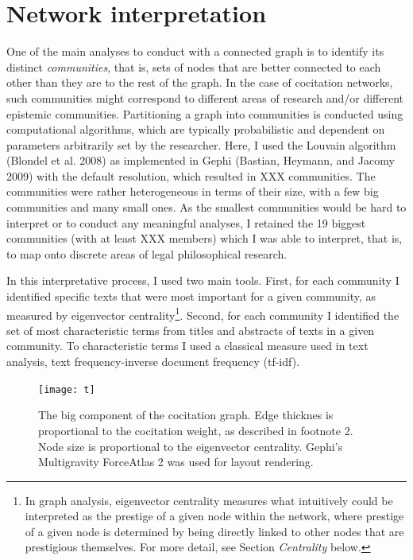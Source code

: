 \documentclass[
]{article}
\begin{document}
\hypertarget{network-interpretation}{%
\section{Network interpretation}\label{network-interpretation}}

One of the main analyses to conduct with a connected graph is to identify its distinct \emph{communities}, that is, sets of nodes that are better connected to each other than they are to the rest of the graph. In the case of cocitation networks, such communities might correspond to different areas of research and/or different epistemic communities. Partitioning a graph into communities is conducted using computational algorithms, which are typically probabilistic and dependent on parameters arbitrarily set by the researcher. Here, I used the Louvain algorithm (Blondel et al. 2008) as implemented in Gephi (Bastian, Heymann, and Jacomy 2009) with the default resolution, which resulted in XXX communities. The communities were rather heterogeneous in terms of their size, with a few big communities and many small ones. As the smallest communities would be hard to interpret or to conduct any meaningful analyses, I retained the 19 biggest communities (with at least XXX members) which I was able to interpret, that is, to map onto discrete areas of legal philosophical research.

In this interpretative process, I used two main tools. First, for each community I identified specific texts that were most important for a given community, as measured by eigenvector centrality\footnote{In graph analysis, eigenvector centrality measures what intuitively could be interpreted as the prestige of a given node within the network, where prestige of a given node is determined by being directly linked to other nodes that are prestigious themselves. For more detail, see Section \emph{Centrality} below.}. Second, for each community I identified the set of most characteristic terms from titles and abstracts of texts in a given community. To characteristic terms I used a classical measure used in text analysis, text frequency-inverse document frequency (tf-idf).

\begin{figure}
\texttt{[image: t]} \caption{The big component of the cocitation graph. Edge thicknes is proportional to the cocitation weight, as described in footnote 2. Node size is proportional to the eigenvector centrality. Gephi’s Multigravity ForceAtlas 2 was used for layout rendering.}\label{fig:figSvg}
\end{figure}
\end{document}
